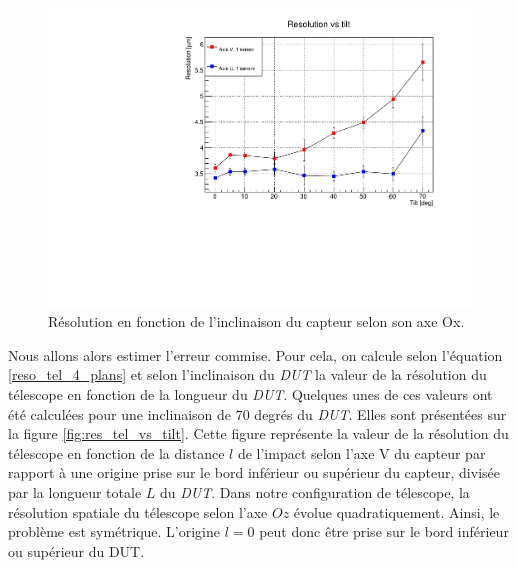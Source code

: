   \begin{figure}[!Htb]
    \begin{center} 
     \includegraphics[scale=0.65]{./figures/reso_vs_tilt_1_sensor.pdf}
     \caption{R\'esolution en fonction de l'inclinaison du capteur selon son axe Ox.}
    \label{fig:reso_vs_tilt}
    \end{center}
  \end{figure}
   
   \medskip
   
   Nous allons alors estimer l'erreur commise. Pour cela, on calcule selon l'\'equation \ref{reso_tel_4_plans} et selon l'inclinaison du \textit{DUT} la valeur de la r\'esolution du t\'elescope en fonction de la longueur du \textit{DUT}. Quelques unes de ces valeurs ont \'et\'e calcul\'ees pour une inclinaison de $70$ degr\'es du \textit{DUT}. Elles sont pr\'esent\'ees sur la figure \ref{fig:res_tel_vs_tilt}. Cette figure repr\'esente la valeur de la r\'esolution du t\'elescope en fonction de la distance $l$ de l'impact selon l'axe V du capteur par rapport \`a une origine prise sur le bord inf\'erieur ou sup\'erieur du capteur, divis\'ee par la longueur totale $L$ du \textit{DUT}. Dans notre configuration de t\'elescope, la résolution spatiale du t\'elescope selon l'axe $Oz$ \'evolue quadratiquement. Ainsi, le probl\`eme est sym\'etrique. L'origine $l=0$ peut donc \^etre prise sur le bord inf\'erieur ou sup\'erieur du DUT.
   
